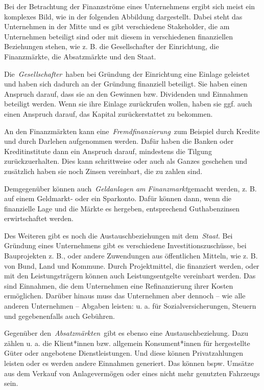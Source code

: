 \documentclass[
  letterpaper,
]{book}
\begin{document}
Bei der Betrachtung der Finanzströme eines Unternehmens ergibt sich
meist ein komplexes Bild, wie in der folgenden Abbildung dargestellt.
Dabei steht das Unternehmen in der Mitte und es gibt verschiedene
Stakeholder, die am Unternehmen beteiligt sind oder mit diesem in
verschiedenen finanziellen Beziehungen stehen, wie z. B. die
Gesellschafter der Einrichtung, die Finanzmärkte, die Absatzmärkte und
den Staat.

Die~\emph{Gesellschafter}~haben bei Gründung der Einrichtung eine
Einlage geleistet und haben sich dadurch an der Gründung finanziell
beteiligt. Sie haben einen Anspruch darauf, dass sie an den Gewinnen
bzw. Dividenden und Einnahmen beteiligt werden. Wenn sie ihre Einlage
zurückrufen wollen, haben sie ggf. auch einen Anspruch darauf, das
Kapital zurückerstattet zu bekommen.

An den Finanzmärkten kann eine~\emph{Fremdfinanzierung}~zum Beispiel
durch Kredite und durch Darlehen aufgenommen werden. Dafür haben die
Banken oder Kreditinstitute dann ein Anspruch darauf, mindestens die
Tilgung zurückzuerhalten. Dies kann schrittweise oder auch als Ganzes
geschehen und zusätzlich haben sie noch Zinsen vereinbart, die zu zahlen
sind.

Demgegenüber können auch~\emph{Geldanlagen am Finanzmarkt}gemacht
werden, z. B. auf einem Geldmarkt- oder ein Sparkonto. Dafür können
dann, wenn die finanzielle Lage und die Märkte es hergeben, entsprechend
Guthabenzinsen erwirtschaftet werden.

Des Weiteren gibt es noch die Austauschbeziehungen mit dem~\emph{Staat}.
Bei Gründung eines Unternehmens gibt es verschiedene
Investitionszuschüsse, bei Bauprojekten z. B., oder andere Zuwendungen
aus öffentlichen Mitteln, wie z. B. von Bund, Land und Kommune. Durch
Projektmittel, die finanziert werden, oder mit den Leistungsträgern
können auch Leistungsentgelte vereinbart werden. Das sind Einnahmen, die
dem Unternehmen eine Refinanzierung ihrer Kosten ermöglichen. Darüber
hinaus muss das Unternehmen aber dennoch -- wie alle anderen Unternehmen
-- Abgaben leisten: u. a. für Sozialversicherungen, Steuern und
gegebenenfalls auch Gebühren.

Gegenüber den~\emph{Absatzmärkten}~gibt es ebenso eine
Austauschbeziehung. Dazu zählen u. a. die Klient*innen bzw. allgemein
Konsument*innen für hergestellte Güter oder angebotene Dienstleistungen.
Und diese können Privatzahlungen leisten oder es werden andere Einnahmen
generiert. Das können bspw. Umsätze aus dem Verkauf von Anlagevermögen
oder eines nicht mehr genutzten Fahrzeugs sein.
\end{document}
